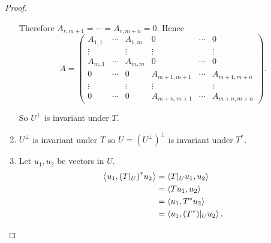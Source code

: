 \begin{proof}
\begin{enumerate}[label={(\alph*)}]
              Therefore $A_{r,m+1} = \cdots = A_{r,m+n} = 0$. Hence
              \[
                  A =
                  \begin{pmatrix}
                      A_{1,1} & \cdots & A_{1,m} & 0           & \cdots & 0           \\
                      \vdots  &        & \vdots  & \vdots      &        & \vdots      \\
                      A_{m,1} & \cdots & A_{m,m} & 0           & \cdots & 0           \\
                      0       & \cdots & 0       & A_{m+1,m+1} & \cdots & A_{m+1,m+n} \\
                      \vdots  &        & \vdots  & \vdots      &        & \vdots      \\
                      0       & \cdots & 0       & A_{m+n,m+1} & \cdots & A_{m+n,m+n}
                  \end{pmatrix}.
              \]

              So $U^{\bot}$ is invariant under $T$.
        \item $U^{\bot}$ is invariant under $T$ so $U = {(U^{\bot})}^{\bot}$ is invariant under $T^{*}$.
        \item Let $u_{1}, u_{2}$ be vectors in $U$.
              \begin{align*}
                  \left\langle{u_{1}, {(T\vert_{U})}^{*}u_{2}}\right\rangle & = \left\langle{T\vert_{U}u_{1}, u_{2}}\right\rangle        \\
                                                             & = \left\langle{Tu_{1}, u_{2}}\right\rangle                 \\
                                                             & = \left\langle{u_{1}, T^{*}u_{2}}\right\rangle             \\
                                                             & = \left\langle{u_{1}, (T^{*})\vert_{U}u_{2}}\right\rangle.
              \end{align*}


\end{enumerate}
\end{proof}
